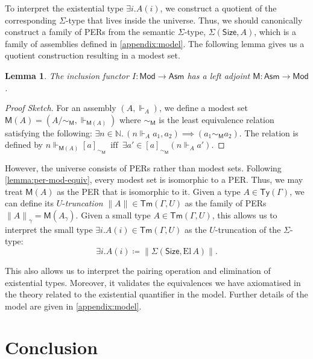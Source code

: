 \documentclass[10pt,a4paper]{article}
\newtheorem{lemma}[theorem]{Lemma}
\theoremstyle{definition}
\theoremstyle{remark}
\renewcommand{\.}{.\,} %
\renewcommand{\:}{:} %
\newcommand{\bN}{\mathbb{N}}
\newcommand{\El}{\mathrm{El}\,}
\newcommand{\Size}{\mathsf{Size}}
\newcommand{\0}{\mathbf{0}}
\newcommand{\1}{\mathbf{1}}
\newcommand\<\langle
\renewcommand\>\rangle
\newcommand{\Mod}{\mathsf{Mod}}
\newcommand{\Asm}{\mathsf{Asm}}
\newcommand{\M}{\mathsf{M}}
\newcommand{\Tr}[1]{{\|{#1}\|}}
\newcommand{\Ty}{\mathsf{Ty}}
\newcommand{\Tm}{\mathsf{Tm}}
\newcommand{\Iff}{\hspace{6pt}\text{iff}\hspace{6pt}}
\theoremstyle{remark}
\begin{document}
To interpret the existential type \( \exists i.A(i) \), we construct a quotient of the corresponding \( \Sigma \)-type that lives inside the universe. Thus, we should canonically construct a family of PERs from the semantic $\Sigma$-type, \( \Sigma(\Size, A) \), which is a family of assemblies defined in \autoref{appendix:model}. The following lemma gives us a quotient construction resulting in a modest set.
\begin{lemma}
    The inclusion functor \( I : \Mod \to \Asm \) has a left adjoint \( \M : \Asm \to \Mod \).
\end{lemma}
\begin{proof}[Proof Sketch]
    For an assembly $(A, \Vdash_A)$, we define a modest set $\M(A) = ( A {/ \!\sim_\M}, \Vdash_{\M(A)})$ where $\sim_\M$ is the least equivalence relation satisfying the following: $\exists n \in \bN \. (n \Vdash_A a_1, a_2) \implies (a_1 \sim_\M a_2)$.
The relation is defined by
\(
n \Vdash_{\M(A)} [ a ]_{\sim_\M} \Iff \exists a' \in [ a ]_{\sim_\M} (n \Vdash_A a').\)
\end{proof}
However, the universe consists of PERs rather than modest sets. Following \autoref{lemma:per-mod-equiv}, every modest set is isomorphic to a PER. Thus, we may treat \( \M(A) \) as the PER that is isomorphic to it. Given a type \( A \in \Ty(\Gamma) \), we can define its \(U\)-\emph{truncation} \( \Tr{A} \in \Tm(\Gamma, U) \) as the family of PERs \( \Tr{A}_\gamma = \M(A_\gamma) \). 
Given a small type \( A \in \Tm(\Gamma, U) \), this allows us to interpret the small type \( \exists i. A(i) \in \Tm(\Gamma, U)\) as the \(U\)-truncation of the \( \Sigma \)-type: 
\[
    \exists i. A(i) \coloneqq \Tr{\Sigma(\Size, \El A)}.
\] 

This also allows us to interpret the pairing operation and elimination of existential types. Moreover, it validates the equivalences we have axiomatised in the theory related to the existential quantifier in the model. Further details of the model are given in \autoref{appendix:model}.

    
    \section{Conclusion} 
    \label{sec:conclusion}
    
\newcommand\bbl{\mathrel{\ooalign{\usefont{U}{matha}{m}{n}\symbol{\string"CE}}}}
\end{document}
